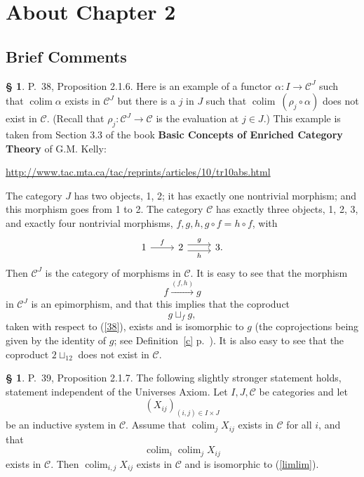 \documentclass[12pt]{article}
\theoremstyle{remark}
\theoremstyle{definition}
\newtheorem{s}[thm]{\S}
\newcommand{\C}{\mathcal C}
\DeclareMathOperator*{\coli}{colim}
\DeclareMathOperator*{\co}{colim}
\begin{document}
\section{About Chapter 2}
%
\subsection{Brief Comments}
%
%
\begin{s}\label{c38}
P.~38, Proposition 2.1.6. Here is an example of a functor $\alpha:I\to\C^J$ such that $\co\alpha$ exists in $\C^J$ but there is a $j$ in $J$ such that $\co\ (\rho_j\circ\alpha)$ does not exist in $\C$. (Recall that $\rho_j:\C^J\to\C$ is the evaluation at $j\in J$.) This example is taken from Section 3.3 of the book \textbf{Basic Concepts of Enriched Category Theory} of G.M. Kelly:%
%
\begin{center}\href{http://www.tac.mta.ca/tac/reprints/articles/10/tr10abs.html}{http://www.tac.mta.ca/tac/reprints/articles/10/tr10abs.html}
\end{center}

The category $J$ has two objects, 1, 2; it has exactly one nontrivial morphism; and this morphism goes from 1 to 2. The category $\C$ has exactly three objects, 1, 2, 3, and exactly four nontrivial morphisms, $f,g,h,g\circ f=h\circ f$, with 
$$
\begin{tikzcd}
1\ar{r}{f}&2\ar[yshift=.7ex]{r}{g}\ar[yshift=-.7ex]{r}[swap]{h}&3.
\end{tikzcd}
$$ 
Then $\C^J$ is the category of morphisms in $\C$. It is easy to see that the morphism 
%
\begin{equation}\label{38}
f\xrightarrow{(f,h)}g 
\end{equation}
%
in $\C^J$ is an epimorphism, and that this implies that the coproduct 
$$
g\sqcup_fg,
$$ 
taken with respect to (\ref{38}), exists and is isomorphic to $g$ (the coprojections being given by the identity of $g$; see Definition~\ref{c} p.~\pageref{c}). It is also easy to see that the coproduct $2\sqcup_12$ does not exist in $\C$.
\end{s}
%
%
\begin{s} 
P.~39, Proposition 2.1.7. The following slightly stronger statement holds, statement independent of the Universes Axiom. Let $I, J, \C$ be categories and let 
$$
(X_{ij})_{(i,j)\in I\times J}
$$ 
be an inductive system in $\C$. Assume that $\coli_jX_{ij}$ exists in $\C$ for all $i$, and that 
\begin{equation}\label{limlim}
\coli_i\coli_jX_{ij}
\end{equation}
exists in $\C$. Then $\coli_{i,j}X_{ij}$ exists in $\C$ and is isomorphic to (\ref{limlim}).
\end{s}
\end{document}
